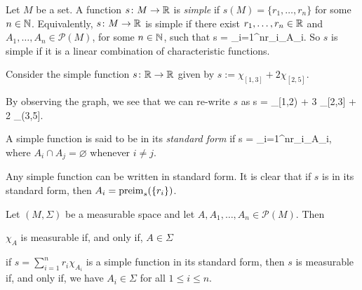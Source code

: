 \bd
Let $M$ be a set. A function $s\colon M \to \mathbb{R}$ is \emph{simple} if $s(M) = \{r_1,\ldots,r_n\}$ for some $n\in \mathbb{N}$. 
\ed
Equivalently, $s\colon M \to \mathbb{R}$ is simple if there exist $r_1,\ldots,r_n\in\mathbb{R}$ and $A_1,\ldots,A_n\in\mathscr{P}(M)$, for some $n\in \mathbb{N}$, such that
\bse
s = \sum_{i=1}^nr_i\chi_{A_i}.
\ese
So $s$ is simple if it is a linear combination of characteristic functions.

\be
Consider the simple function $s\colon \mathbb{R} \to \mathbb{R}$ given by $s:=\chi_{[1,3]}+2\chi_{[2,5]}$.
\begin{center}
\end{center}
By observing the graph, we see that we can re-write $s$ as
\bse
s = \chi_{[1,2)} + 3 \chi_{[2,3]} + 2 \chi_{(3,5]}.
\ese
\ee

\bd
A simple function is said to be in its \emph{standard form} if
\bse
s = \sum_{i=1}^nr_i\chi_{A_i},
\ese
where $A_i \cap A_j = \varnothing$ whenever $i\neq j$.
\ed

Any simple function can be written in standard form. It is clear that if $s$ is in its standard form, then $A_i = \operatorname{preim}_s(\{r_i\})$. 

\bp
Let $(M,\Sigma)$ be a measurable space and let $A,A_1,\ldots,A_n\in\mathscr{P}(M)$. Then
\ben[label=(\roman*)]
\item $\chi_A$ is measurable if, and only if, $A\in\Sigma$
\item if $s=\sum_{i=1}^n r_i \chi_{A_i}$ is a simple function in its standard form, then $s$ is measurable if, and only if, we have $A_i\in \Sigma$ for all $1\leq i\leq n$.
\een
\ep

